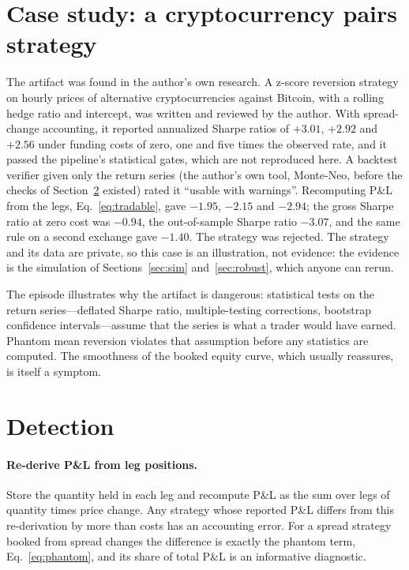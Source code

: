 \documentclass[11pt]{article}
\theoremstyle{remark}
\begin{document}
\section{Case study: a cryptocurrency pairs strategy}
\label{sec:case}

The artifact was found in the author's own research. A z-score reversion strategy on hourly prices of
alternative cryptocurrencies against Bitcoin, with a rolling hedge ratio and intercept, was written and reviewed by the author. With spread-change accounting, it reported annualized Sharpe ratios
of $+3.01$, $+2.92$ and $+2.56$ under funding costs of zero, one and five times the observed rate, and it passed the
pipeline's statistical gates, which are not reproduced here. A backtest verifier given only the return series (the author's own tool, Monte-Neo, before the checks of
Section~\ref{sec:detect} existed) rated it ``usable with warnings''.
Recomputing P\&L from the legs, Eq.~\eqref{eq:tradable}, gave $-1.95$, $-2.15$ and $-2.94$; the gross Sharpe
ratio at zero cost was $-0.94$, the out-of-sample Sharpe ratio $-3.07$, and the same rule on a second exchange
gave $-1.40$. The strategy was rejected. The strategy and its data are private, so this case is an illustration, not
evidence: the evidence is the simulation of Sections~\ref{sec:sim} and~\ref{sec:robust}, which anyone can rerun.

The episode illustrates why the artifact is dangerous: statistical tests on the return series---deflated Sharpe
ratio, multiple-testing corrections, bootstrap confidence intervals---assume that the series is what a trader
would have earned. Phantom mean reversion violates that assumption before any statistics are computed. The
smoothness of the booked equity curve, which usually reassures, is itself a symptom.

\section{Detection}
\label{sec:detect}

\paragraph{Re-derive P\&L from leg positions.} Store the quantity held in each leg and recompute P\&L as the sum
over legs of quantity times price change. Any strategy whose reported P\&L differs from this re-derivation by more
than costs has an accounting error. For a spread strategy booked from spread changes the difference is exactly the phantom term,
Eq.~\eqref{eq:phantom}, and its share of total P\&L is an informative diagnostic.
\end{document}
